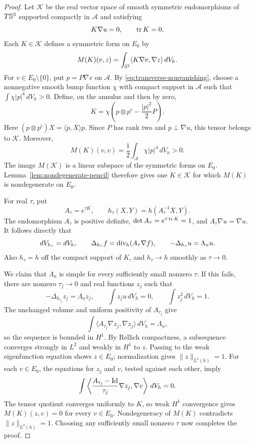 \begin{proof}
Let $\mathcal K$ be the real vector space of smooth symmetric
endomorphisms of $T\mathbb S^3$ supported compactly in $\mathcal A$ and
satisfying
\[
 K\nabla u=0,\qquad \operatorname{tr} K=0.
\]
Each $K\in\mathcal K$ defines a symmetric form on $E_0$ by
\begin{equation}\label{eq:pinning-form}
 M(K)(v,z)=\int_{\mathbb S^3}\langle K\nabla v,\nabla z\rangle\,dV_h.
\end{equation}
For $v\in E_0\setminus\{0\}$, put $p=P\nabla v$ on $\mathcal A$.
By \eqref{eq:transverse-nonvanishing}, choose a nonnegative smooth
bump function $\chi$ with compact support in $\mathcal A$ such that
$\int\chi|p|^4\,dV_h>0$.  Define, on the annulus and then by zero,
\[
 K=\chi\left(p\otimes p^\flat-\frac{|p|^2}{2}P\right).
\]
Here $(p\otimes p^\flat)X=\langle p,X\rangle p$.
Since $P$ has rank two and $p\perp\nabla u$, this tensor belongs to
$\mathcal K$.  Moreover,
\[
 M(K)(v,v)=\frac12\int_{\mathcal A}\chi|p|^4\,dV_h>0.
\]
The image $M(\mathcal K)$ is a linear subspace of the symmetric
forms on $E_0$.  Lemma~\ref{lem:nondegenerate-pencil} therefore gives
one $K\in\mathcal K$ for which $M(K)$ is nondegenerate on $E_0$.

For real $\tau$, put
\[
 A_\tau=e^{\tau K},\qquad
 h_\tau(X,Y)=h(A_\tau^{-1}X,Y).
\]
The endomorphism $A_\tau$ is positive definite,
$\det A_\tau=e^{\tau\operatorname{tr} K}=1$, and
$A_\tau\nabla u=\nabla u$.  It follows directly that
\[
 dV_{h_\tau}=dV_h,\qquad
 \Delta_{h_\tau}f=\operatorname{div}_h(A_\tau\nabla f),\qquad
 -\Delta_{h_\tau}u=\Lambda_nu.
\]
Also $h_\tau=h$ off the compact support of $K$, and
$h_\tau\to h$ smoothly as $\tau\to0$.

We claim that $\Lambda_n$ is simple for every sufficiently small
nonzero $\tau$.  If this fails, there are nonzero
$\tau_j\to0$ and real functions $z_j$ such that
\[
 -\Delta_{h_{\tau_j}}z_j=\Lambda_nz_j,\qquad
 \int z_ju\,dV_h=0,\qquad \int z_j^2\,dV_h=1.
\]
The unchanged volume and uniform positivity of $A_{\tau_j}$ give
\[
 \int\langle A_{\tau_j}\nabla z_j,\nabla z_j\rangle\,dV_h
 =\Lambda_n,
\]
so the sequence is bounded in $H^1$.  By Rellich compactness, a
subsequence converges strongly in $L^2$ and weakly in $H^1$ to
$z$.  Passing to the weak eigenfunction equation shows $z\in E_0$;
normalization gives $\|z\|_{L^2(h)}=1$.  For each $v\in E_0$, the
equations for $z_j$ and $v$, tested against each other, imply
\[
 \int\left\langle
 \frac{A_{\tau_j}-\operatorname{Id}}{\tau_j}\nabla z_j,\nabla v
 \right\rangle\,dV_h=0.
\]
The tensor quotient converges uniformly to $K$, so weak $H^1$
convergence gives $M(K)(z,v)=0$ for every $v\in E_0$.
Nondegeneracy of $M(K)$ contradicts $\|z\|_{L^2(h)}=1$.
Choosing any sufficiently small nonzero $\tau$ now completes the proof.
\end{proof}

